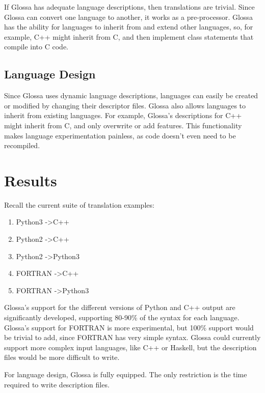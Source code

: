 \documentclass{article}
\begin{document}
If Glossa has adequate language descriptions, then translations are trivial. 
Since Glossa can convert one language to another, it works as a pre-processor.
Glossa has the ability for languages to inherit from and extend other languages, so, for example, C++ might inherit from C, and then implement class statements that compile into C code.

\subsection{Language Design}

Since Glossa uses dynamic language descriptions, languages can easily be created or modified by changing their descriptor files. Glossa also allows languages to inherit from existing languages. For example, Glossa's descriptions for C++ might inherit from C, and only overwrite or add features.
This functionality makes language experimentation painless, as code doesn't even need to be recompiled.


\section{Results}

Recall the current suite of translation examples:
\begin{enumerate}
    \item Python3 -\textgreater C++
    \item Python2 -\textgreater C++ 
    \item Python2 -\textgreater Python3
    \item FORTRAN -\textgreater C++ 
    \item FORTRAN -\textgreater Python3 
\end{enumerate}

Glossa's support for the different versions of Python and C++ output are significantly developed, supporting 80-90\% of the syntax for each language. 
Glossa's support for FORTRAN is more experimental, but 100\% support would be trivial to add, since FORTRAN has very simple syntax.
Glossa could currently support more complex input languages, like C++ or Haskell, but the description files would be more difficult to write.

For language design, Glossa is fully equipped. The only restriction is the time required to write description files.
\end{document}
